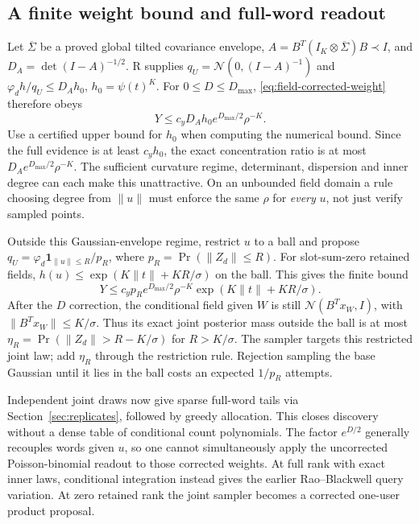 \documentclass[10pt,a4paper]{article}
\newcommand{\ind}{\mathbf 1}
\begin{document}
\subsection{A finite weight bound and full-word readout}
Let $\overline\Sigma$ be a proved global tilted covariance envelope,
$A=B^T(I_K\otimes\overline\Sigma)B\prec I$, and
$D_A=\det(I-A)^{-1/2}$.
R supplies $q_U=\mathcal N(0,(I-A)^{-1})$ and
$\varphi_d h/q_U\leq D_A h_0$, $h_0=\psi(t)^K$.
For $0\leq D\leq D_{\max}$, \eqref{eq:field-corrected-weight} therefore obeys
\begin{equation}
 Y\leq c_yD_Ah_0 e^{D_{\max}/2}\rho^{-K}.
 \label{eq:field-joint-bound}
\end{equation}
Use a certified upper bound for $h_0$ when computing the numerical bound.
Since the full evidence is at least $c_yh_0$, the exact concentration ratio is at most
$D_Ae^{D_{\max}/2}\rho^{-K}$. The sufficient curvature regime, determinant, dispersion and inner degree
can each make this unattractive. On an unbounded field domain a rule choosing degree from $\|u\|$
must enforce the same $\rho$ for \emph{every} $u$, not just verify sampled points.

Outside this Gaussian-envelope regime, restrict $u$ to a ball and propose
$q_U=\varphi_d\ind_{\|u\|\leq R}/p_R$, where $p_R=\Pr(\|Z_d\|\leq R)$.
For slot-sum-zero retained fields,
$h(u)\leq\exp(K\|t\|+KR/\sigma)$ on the ball. This gives the finite bound
\[
 Y\leq c_y p_R e^{D_{\max}/2}\rho^{-K}
                \exp(K\|t\|+KR/\sigma).
\]
After the $D$ correction, the conditional field given $W$ is still
$\mathcal N(B^Tx_W,I)$, with $\|B^Tx_W\|\leq K/\sigma$.
Thus its exact joint posterior mass outside the ball is at most
$\eta_R=\Pr(\|Z_d\|>R-K/\sigma)$ for $R>K/\sigma$.
The sampler targets this restricted joint law; add $\eta_R$ through the restriction rule.
Rejection sampling the base Gaussian until it lies in the ball costs an expected $1/p_R$ attempts.

Independent joint draws now give sparse full-word tails via Section~\ref{sec:replicates}, followed by
greedy allocation. This closes discovery without a dense table of conditional count polynomials.
The factor $e^{D/2}$ generally recouples words given $u$, so one cannot simultaneously apply the
uncorrected Poisson-binomial readout to those corrected weights.
At full rank with exact inner laws, conditional integration instead gives the earlier Rao--Blackwell
query variation. At zero retained rank the joint sampler becomes a corrected one-user product proposal.
\end{document}
